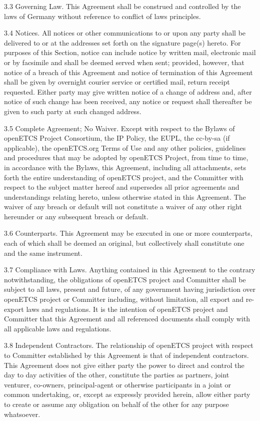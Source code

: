 3.3 Governing Law. This Agreement shall be construed and controlled by the laws of
Germany without reference to conflict of laws principles.

3.4 Notices. All notices or other communications to or upon any party shall be delivered to or
at the addresses set forth on the signature page(s) hereto. For purposes of this Section,
notice can include notice by written mail, electronic mail or by facsimile and shall be deemed
served when sent; provided, however, that notice of a breach of this Agreement and notice of
termination of this Agreement shall be given by overnight courier service or certified mail,
return receipt requested. Either party may give written notice of a change of address and,
after notice of such change has been received, any notice or request shall thereafter be
given to such party at such changed address.

3.5 Complete Agreement; No Waiver. Except with respect to the Bylaws of openETCS
Project Consortium, the IP Policy, the EUPL, the cc-by-sa (if applicable), the openETCS.org
Terms of Use and any other policies, guidelines and procedures that may be adopted by
openETCS Project, from time to time, in accordance with the Bylaws, this Agreement,
including all attachments, sets forth the entire understanding of openETCS project, and the
Committer with respect to the subject matter hereof and supersedes all prior agreements and
understandings relating hereto, unless otherwise stated in this Agreement. The waiver of any
breach or default will not constitute a waiver of any other right hereunder or any subsequent
breach or default.

3.6 Counterparts. This Agreement may be executed in one or more counterparts, each of
which shall be deemed an original, but collectively shall constitute one and the same
instrument.

3.7 Compliance with Laws. Anything contained in this Agreement to the contrary
notwithstanding, the obligations of openETCS project and Committer shall be subject to all
laws, present and future, of any government having jurisdiction over openETCS project or
Committer including, without limitation, all export and re-export laws and regulations. It is the
intention of openETCS project and Committer that this Agreement and all referenced
documents shall comply with all applicable laws and regulations.

3.8 Independent Contractors. The relationship of openETCS project with respect to
Committer established by this Agreement is that of independent contractors. This Agreement
does not give either party the power to direct and control the day to day activities of the other,
constitute the parties as partners, joint venturer, co-owners, principal-agent or otherwise
participants in a joint or common undertaking, or, except as expressly provided herein, allow
either party to create or assume any obligation on behalf of the other for any purpose
whatsoever.

